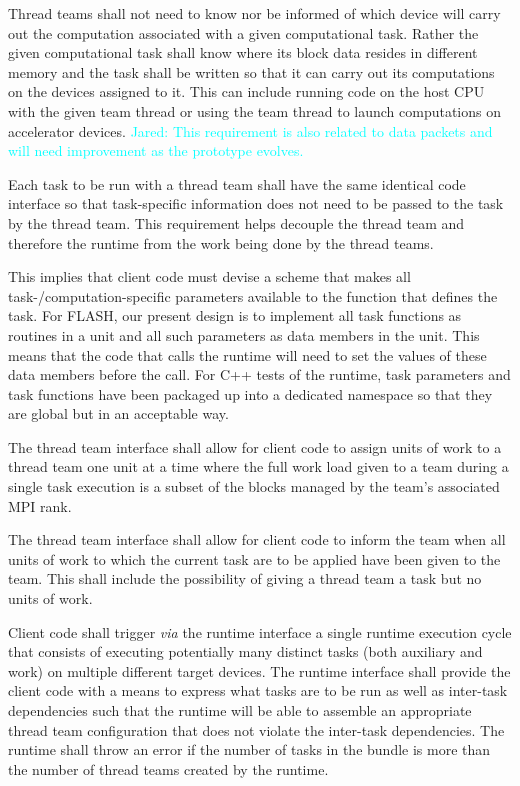 \documentclass{article}
\newcommand{\Jared}[1]          {\textcolor{cyan}{Jared: #1}}
\begin{document}
\begin{req}
Thread teams shall not need to know nor be informed of which device will carry
out the computation associated with a given computational task.  Rather the
given computational task shall know where its block data resides in different
memory and the task shall be written so that it can carry out its computations
on the devices assigned to it.  This can include running code on the host CPU
with the given team thread or using the team thread to launch computations on
accelerator devices.  \Jared{This requirement is also related to data
packets and will need improvement as the prototype evolves.}
\end{req}

\begin{req}
Each task to be run with a thread team shall have the same identical code
interface so that task-specific information does not need to be passed to the
task by the thread team.  This requirement helps decouple the thread team and
therefore the runtime from the work being done by the thread teams.
\end{req}

This implies that client code must devise a scheme that makes all
task-/computation-specific parameters available to the function that defines the
task.  For FLASH, our present design is to implement all task functions as
routines in a unit and all such parameters as data members in the unit.  This
means that the code that calls the runtime will need to set the values of these
data members before the call.  For C++ tests of the runtime, task parameters
and task functions have been packaged up into a dedicated namespace so that they
are global but in an acceptable way.

\begin{req}
The thread team interface shall allow for client code to assign units of
work to a thread team one unit at a time where the full work load given to a
team during a single task execution is a subset of the blocks managed by the
team's associated MPI rank.
\end{req}

\begin{req}
The thread team interface shall allow for client code to inform the team when
all units of work to which the current task are to be applied have been given to
the team.  This shall include the possibility of giving a thread team a task but
no units of work.
\end{req}

\begin{req}
Client code shall trigger \textit{via} the runtime interface a single runtime
execution cycle that consists of executing potentially many distinct tasks (both
auxiliary and work) on multiple different target devices.  The runtime interface
shall provide the client code with a means to express what tasks are to be run
as well as inter-task dependencies such that the runtime will be able to
assemble an appropriate thread team configuration that does not violate the
inter-task dependencies.  The runtime shall throw an error if the number of
tasks in the bundle is more than the number of thread teams created by the
runtime.
\end{req}
\end{document}
